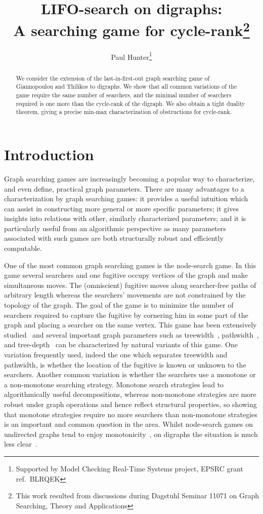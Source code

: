 \documentclass{llncs}
\title{LIFO-search on digraphs:\\A searching game for cycle-rank\thanks{This work resulted from discussions during Dagstuhl Seminar 11071 on Graph Searching, Theory and Applications}}
\author{Paul Hunter\thanks{Supported by Model Checking Real-Time Systems project, EPSRC grant ref.~BLRQEK}}
\institute{Department of Computer Science, University of Oxford\\\email{paul.hunter@cs.ox.ac.uk}}
\begin{document}
\maketitle

\begin{abstract}
We consider the extension of the last-in-first-out graph searching game of Giannopoulou and  Thilikos to digraphs.  We show that all common variations of the game require the same number of searchers, and the minimal number of searchers required is one more than the cycle-rank of the digraph.  We also obtain a tight duality theorem, giving a precise min-max characterization of obstructions for cycle-rank.
\end{abstract}
\section{Introduction}



Graph searching games are increasingly becoming a popular way to characterize, and even define, practical graph parameters.   There are many advantages to a characterization by graph searching games:  it provides a useful intuition which can assist in constructing more general or more specific parameters; it gives insights into relations with other, similarly characterized parameters; 
and it is particularly useful from an algorithmic perspective as many parameters associated with such games are both structurally robust and efficiently computable.  



One of the most common graph searching games is the node-search game.  In this game several searchers and one fugitive occupy vertices of the graph and make simultaneous moves.  The (omniscient) fugitive moves along searcher-free paths of arbitrary length whereas the searchers' movements are not constrained by the topology of the graph.  The goal of the game is to minimize the number of searchers required to capture the fugitive by cornering him in some part of the graph and placing a searcher on the same vertex.  This game has been extensively studied~\cite{DKT97} and several important graph parameters such as treewidth~\cite{ST93}, pathwidth~\cite{KP86}, and tree-depth~\cite{NdM06} can be characterized by natural variants of this game.  
One variation frequently used, indeed the one which separates treewidth and pathwidth, is whether the location of the fugitive is known or unknown to the searchers.  
Another common variation is whether the searchers use a monotone or a non-monotone searching strategy.  Monotone search strategies lead to algorithmically useful decompositions, whereas non-monotone strategies are more robust under graph operations and hence reflect structural properties, so showing that monotone strategies require no more searchers than non-monotone strategies is an important and common question in the area.
Whilst node-search games on undirected graphs tend to enjoy monotonicity~\cite{BS91,ST93,LaP93}, on digraphs the situation is much less clear~\cite{Bar05,Adl05,KO07}.
\end{document}
